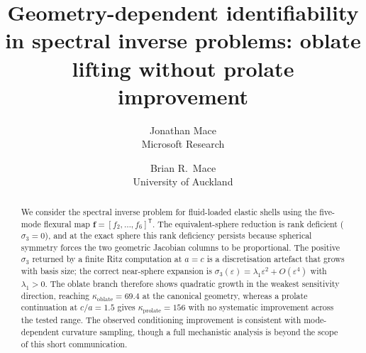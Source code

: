 \documentclass[12pt]{article}
\title{Geometry-dependent identifiability in spectral inverse problems: oblate lifting without prolate improvement}
\author{Jonathan Mace\\Microsoft Research \and Brian R.\ Mace\\University of Auckland}
\date{}
\begin{document}
\maketitle

\begin{abstract}
We consider the spectral inverse problem for fluid-loaded elastic shells using
the five-mode flexural map $\mathbf{f}=[f_2,\ldots,f_6]^\mathsf{T}$.  The
equivalent-sphere reduction is rank deficient ($\sigma_3=0$), and at the exact
sphere this rank deficiency persists because spherical symmetry forces the two
geometric Jacobian columns to be proportional.  The positive $\sigma_3$ returned
by a finite Ritz computation at $a=c$ is a discretisation artefact that grows
with basis size; the correct near-sphere expansion is
$\sigma_3(\varepsilon)=\lambda_1\varepsilon^2+O(\varepsilon^4)$ with
$\lambda_1>0$.  The oblate branch therefore shows quadratic growth in the
weakest sensitivity direction, reaching
$\kappa_\mathrm{oblate}=\num{69.4}$ at the canonical geometry, whereas a
prolate continuation at $c/a=\num{1.5}$ gives $\kappa_\mathrm{prolate}=156$
with no systematic improvement across the tested range.  The observed
conditioning improvement is consistent with mode-dependent curvature sampling,
though a full mechanistic analysis is beyond the scope of this short
communication.
\end{abstract}









\end{document}
